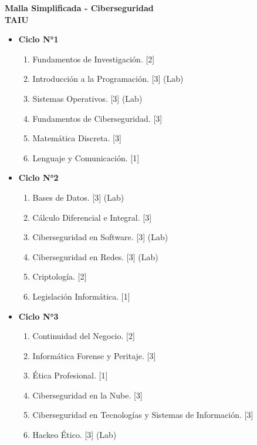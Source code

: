 \documentclass{article}
\begin{document}
    \fontsize{14}{16}\selectfont

    \begin{center}
        \textbf{Malla Simplificada - Ciberseguridad \\ TAIU}
    \end{center}

    \begin{itemize}
        \item \textbf{Ciclo N°1}
            \begin{enumerate}
                \item Fundamentos de Investigación. [2]
                \item Introducción a la Programación. [3] (Lab)
                \item Sistemas Operativos. [3] (Lab)
                \item Fundamentos de Ciberseguridad. [3]
                \item Matemática Discreta. [3]
                \item Lenguaje y Comunicación. [1]
            \end{enumerate}

        \item \textbf{Ciclo N°2}
            \begin{enumerate}[start=7]
                \item Bases de Datos. [3] (Lab)
                \item Cálculo Diferencial e Integral. [3]
                \item Ciberseguridad en Software. [3] (Lab)
                \item Ciberseguridad en Redes. [3] (Lab)
                \item Criptología. [2]
                \item Legislación Informática. [1]
            \end{enumerate}

            \item \textbf{Ciclo N°3}
            \begin{enumerate} [start=13]
                \item Continuidad del Negocio. [2]
                \item Informática Forense y Peritaje. [3]
                \item Ética Profesional. [1]
                \item Ciberseguridad en la Nube. [3]
                \item Ciberseguridad en Tecnologías y Sistemas de Información. [3]
                \item Hackeo Ético. [3] (Lab)
            \end{enumerate}


\end{itemize}
\end{document}
